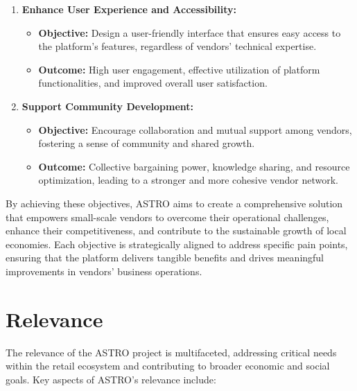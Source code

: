 \begin{enumerate}
	\item \textbf{Enhance User Experience and Accessibility:}
	      \begin{itemize}
		      \item \textbf{Objective:} Design a user-friendly interface that ensures easy access to the platform’s features, regardless of vendors’ technical expertise.
		      \item \textbf{Outcome:} High user engagement, effective utilization of platform functionalities, and improved overall user satisfaction.
	      \end{itemize}

	\item \textbf{Support Community Development:}
	      \begin{itemize}
		      \item \textbf{Objective:} Encourage collaboration and mutual support among vendors, fostering a sense of community and shared growth.
		      \item \textbf{Outcome:} Collective bargaining power, knowledge sharing, and resource optimization, leading to a stronger and more cohesive vendor network.
	      \end{itemize}
\end{enumerate}

By achieving these objectives, ASTRO aims to create a comprehensive solution that empowers small-scale vendors to overcome their operational challenges, enhance their competitiveness, and contribute to the sustainable growth of local economies. Each objective is strategically aligned to address specific pain points, ensuring that the platform delivers tangible benefits and drives meaningful improvements in vendors' business operations.




\section{Relevance}

The relevance of the ASTRO project is multifaceted, addressing critical needs within the retail ecosystem and contributing to broader economic and social goals. Key aspects of ASTRO’s relevance include:

